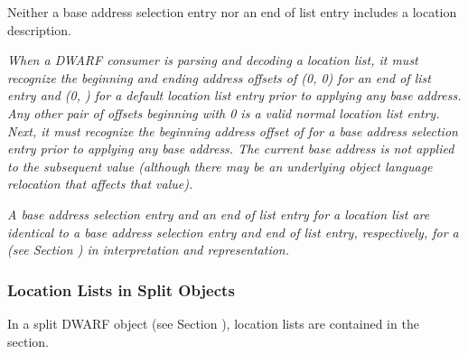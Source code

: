Neither a base address selection entry nor an end of list
entry includes a location description.

\textit{When a DWARF consumer is parsing and decoding a location
list, it must recognize the beginning and ending address
offsets of (0, 0) for an end of list entry and (0, ) for
a default location list entry prior to applying any base
address. Any other pair of offsets beginning with 0 is a
valid normal location list entry. Next, it must recognize the
beginning address offset of  for a base address selection
entry prior to applying any base address. The current base
address is not applied to the subsequent value (although there
may be an underlying object language relocation that affects
that value).}

\textit{A base address selection entry and an end of list
entry for a location list are identical to a base address
selection entry and end of list entry, respectively, for a
(see Section ) 
in interpretation
and representation.}

\subsubsection{Location Lists in Split Objects}
\label{chap:locationlistsinsplitobjects}
In a split DWARF object (see 
Section ), 
location lists are contained in the \dotdebuglocdwo{} section.

